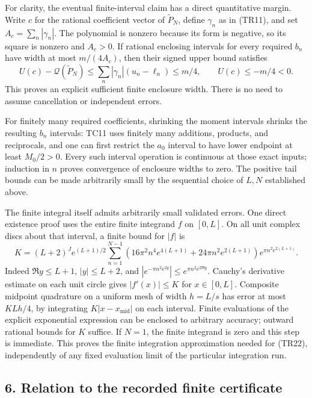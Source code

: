 For clarity, the eventual finite-interval claim has a direct quantitative margin. Write \(c\) for the rational coefficient vector of \(\widetilde P_N\), define \(\gamma_n\) as in (TR11), and set \(A_c=\sum_n|\gamma_n|\). The polynomial is nonzero because its form is negative, so its square is nonzero and \(A_c>0\). If rational enclosing intervals for every required \(b_n\) have width at most \(m/(4A_c)\), then their signed upper bound satisfies \[
U(c)-\mathcal Q(\widetilde P_N)
\le\sum_n|\gamma_n|(u_n-\ell_n)
\le m/4,
\qquad U(c)\le-m/4<0.
\tag{TR22}
\] This proves an explicit sufficient finite enclosure width. There is no need to assume cancellation or independent errors.

For finitely many required coefficients, shrinking the moment intervals shrinks the resulting \(b_n\) intervals: TC11 uses finitely many additions, products, and reciprocals, and one can first restrict the \(a_0\) interval to have lower endpoint at least \(M_0/2>0\). Every such interval operation is continuous at those exact inputs; induction in \(n\) proves convergence of enclosure widths to zero. The positive tail bounds can be made arbitrarily small by the sequential choice of \(L,N\) established above.

The finite integral itself admits arbitrarily small validated errors. One direct existence proof uses the entire finite integrand \(f\) on \([0,L]\). On all unit complex discs about that interval, a finite bound for \(|f|\) is \[
K=(L+2)^J e^{(L+1)/2}
\sum_{n=1}^{N-1}
\left(16\pi^2n^4e^{4(L+1)}+24\pi n^2e^{2(L+1)}\right)
e^{\pi n^2e^{2(L+1)}}.
\tag{TR23}
\] Indeed \(\Re y\le L+1\), \(|y|\le L+2\), and \(|e^{-\pi n^2e^{2y}}|\le e^{\pi n^2e^{2\Re y}}\). Cauchy's derivative estimate on each unit circle gives \(|f'(x)|\le K\) for \(x\in[0,L]\). Composite midpoint quadrature on a uniform mesh of width \(h=L/s\) has error at most \(KLh/4\), by integrating \(K|x-x_{\mathrm{mid}}|\) on each interval. Finite evaluations of the explicit exponential expression can be enclosed to arbitrary accuracy; outward rational bounds for \(K\) suffice. If \(N=1\), the finite integrand is zero and this step is immediate. This proves the finite integration approximation needed for (TR22), independently of any fixed evaluation limit of the particular integration run.

\subsection{6. Relation to the recorded finite certificate}\label{C47stage:TCReview:relation-to-the-recorded-finite-certificate}

